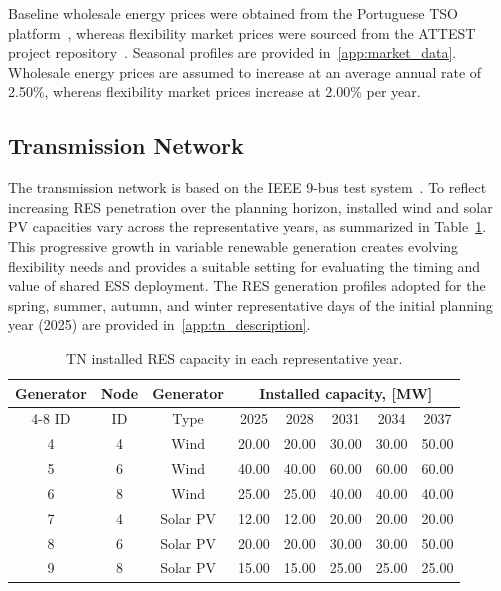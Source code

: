 \documentclass[preprint,12pt]{elsarticle}
\begin{document}
Baseline wholesale energy prices were obtained from the Portuguese TSO platform~\cite{ren_market_platform}, whereas flexibility market prices were sourced from the ATTEST project repository~\cite{attest_project_repo}. Seasonal profiles are provided in~\ref{app:market_data}. Wholesale energy prices are assumed to increase at an average annual rate of 2.50\%, whereas flexibility market prices increase at 2.00\% per year.

\subsection{Transmission Network}

The transmission network is based on the IEEE 9-bus test system~\cite{zimmerman_2011}. To reflect increasing RES penetration over the planning horizon, installed wind and solar PV capacities vary across the representative years, as summarized in Table~\ref{tab:cs3_tn_res_generators}. This progressive growth in variable renewable generation creates evolving flexibility needs and provides a suitable setting for evaluating the timing and value of shared ESS deployment. The RES generation profiles adopted for the spring, summer, autumn, and winter representative days of the initial planning year (2025) are provided in~\ref{app:tn_description}.

\begin{table}[htbp!]
    \centering
    \caption{TN installed RES capacity in each representative year.}
    \begin{tabular}{ccc ccccc}
        \toprule
        Generator   & Node  & Generator & \multicolumn{5}{c}{Installed capacity, [MW]}\\  \cmidrule{4-8}
        ID          & ID    & Type      & 2025  & 2028  & 2031  & 2034   & 2037 \\ 
        \midrule
        4 & 4 &  Wind     & 20.00 & 20.00 & 30.00 & 30.00 & 50.00\\
        5 & 6 &  Wind     & 40.00 & 40.00 & 60.00 & 60.00 & 60.00\\
        6 & 8 &  Wind     & 25.00 & 25.00 & 40.00 & 40.00 & 40.00\\
        7 & 4 &  Solar PV & 12.00 & 12.00 & 20.00 & 20.00 & 20.00\\
        8 & 6 &  Solar PV & 20.00 & 20.00 & 30.00 & 30.00 & 50.00\\
        9 & 8 &  Solar PV & 15.00 & 15.00 & 25.00 & 25.00 & 25.00\\
        \bottomrule
    \end{tabular}
    \label{tab:cs3_tn_res_generators}
\end{table}
\end{document}
